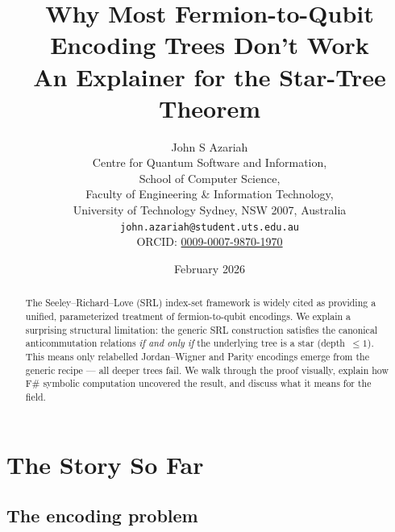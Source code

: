 \documentclass[11pt,a4paper]{article}
\theoremstyle{definition}
\begin{document}
\title{\bfseries Why Most Fermion-to-Qubit\\Encoding Trees Don't Work\\[6pt]
  \large An Explainer for the Star-Tree Theorem}

\author{John S Azariah\\
  \small Centre for Quantum Software and Information,\\
  \small School of Computer Science,\\
  \small Faculty of Engineering \& Information Technology,\\
  \small University of Technology Sydney, NSW 2007, Australia\\
  \small\texttt{john.azariah@student.uts.edu.au}\\
  \small ORCID: \href{https://orcid.org/0009-0007-9870-1970}{0009-0007-9870-1970}}

\date{February 2026}

\maketitle

\begin{abstract}
The Seeley--Richard--Love (SRL) index-set framework is widely cited as
providing a unified, parameterized treatment of fermion-to-qubit
encodings.  We explain a surprising structural limitation: the generic
SRL construction satisfies the canonical anticommutation relations
\emph{if and only if} the underlying tree is a star (depth~$\le 1$).
This means only relabelled Jordan--Wigner and Parity encodings emerge
from the generic recipe --- all deeper trees fail.  We walk through the
proof visually, explain how F\# symbolic computation uncovered the
result, and discuss what it means for the field.
\end{abstract}

\tableofcontents
\vspace{1em}

\section{The Story So Far}
\label{sec:story}

\subsection{The encoding problem}
\end{document}
